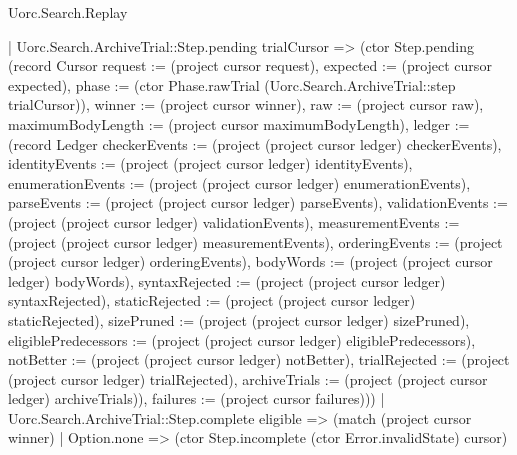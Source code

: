 \begin{lexlean}{Uorc.Search.Replay}
\begin{semanticmodule}
{      | Uorc.Search.ArchiveTrial::Step.pending trialCursor => (ctor Step.pending (record Cursor {request := (project cursor request), expected := (project cursor expected), phase := (ctor Phase.rawTrial (Uorc.Search.ArchiveTrial::step trialCursor)), winner := (project cursor winner), raw := (project cursor raw), maximumBodyLength := (project cursor maximumBodyLength), ledger := (record Ledger {checkerEvents := (project (project cursor ledger) checkerEvents), identityEvents := (project (project cursor ledger) identityEvents), enumerationEvents := (project (project cursor ledger) enumerationEvents), parseEvents := (project (project cursor ledger) parseEvents), validationEvents := (project (project cursor ledger) validationEvents), measurementEvents := (project (project cursor ledger) measurementEvents), orderingEvents := (project (project cursor ledger) orderingEvents), bodyWords := (project (project cursor ledger) bodyWords), syntaxRejected := (project (project cursor ledger) syntaxRejected), staticRejected := (project (project cursor ledger) staticRejected), sizePruned := (project (project cursor ledger) sizePruned), eligiblePredecessors := (project (project cursor ledger) eligiblePredecessors), notBetter := (project (project cursor ledger) notBetter), trialRejected := (project (project cursor ledger) trialRejected), archiveTrials := (project (project cursor ledger) archiveTrials)}), failures := (project cursor failures)}))
      | Uorc.Search.ArchiveTrial::Step.complete eligible => (match (project cursor winner)
        | Option.none => (ctor Step.incomplete (ctor Error.invalidState) cursor)
}
\end{semanticmodule}
\end{lexlean}
